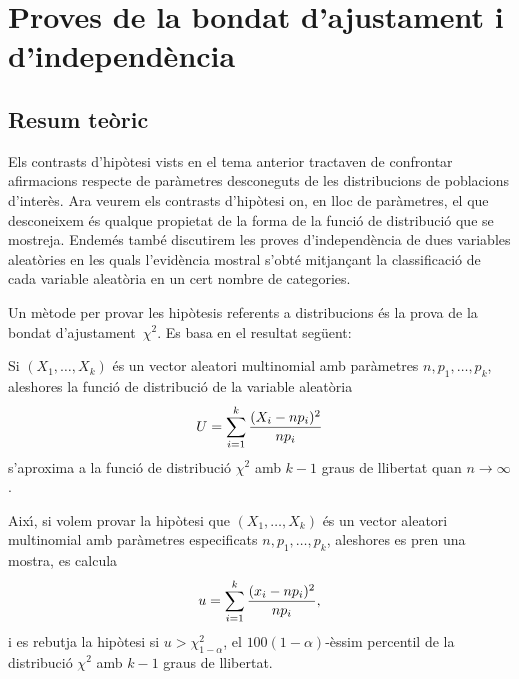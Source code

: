 \chapter{Proves de la bondat d'ajustament i d'independ\`encia}

\section{Resum te\`oric}

Els contrasts d'hip\`otesi vists en el tema anterior tractaven 
de confrontar
afirmacions respecte de par\`ametres
 desconeguts de les distribucions de 
poblacions d'inter\`es. Ara veurem els contrasts d'hip\`otesi on, 
en lloc de par\`ametres, el que desconeixem \'es qualque propietat de la 
forma de la funci\'o de distribuci\'o que se mostreja.
Endem\'es tamb\'e discutirem les proves d'independ\`encia 
de dues variables aleat\`ories en les quals l'evid\`encia mostral 
s'obt\'e mitjan\c cant la classificaci\'o de cada variable aleat\`oria 
en un cert nombre de categories.

Un m\`etode per provar les hip\`otesis referents a distribucions 
\'es la prova de la
bondat d'ajustament~$\chi^2$. Es basa en el resultat seg\"uent:

\begin{proposition}
Si $(X_1, \ldots , X_k)$ \'es un vector aleatori multinomial 
amb par\`ametres $n,
p_1, \ldots , p_k$, aleshores la 
funci\'o de distribuci\'o de la variable aleat\`oria
$$U = \sum_{i=1}^k {(X_i - n p_i)^2 \over n p_i}$$
s'aproxima a la funci\'o de distribuci\'o $\chi^2$ amb $k-1$ graus 
de llibertat quan $n \to \infty$.
\end{proposition}

Aix\'{\i}, si volem provar la hip\`otesi que $(X_1, \ldots , X_k)$ 
\'es un vector aleatori multinomial amb par\`ametres especificats 
$n, p_1, \ldots , p_k$, aleshores es pren una mostra, es calcula
$$u = \sum_{i=1}^k {(x_i - n p_i)^2 \over n p_i},$$
i es rebutja la hip\`otesi si $u > \chi_{1-\alpha}^2$, 
el $100(1-\alpha)$-\`essim percentil de la distribuci\'o $\chi^2$ amb $k-1$ 
graus de llibertat.


